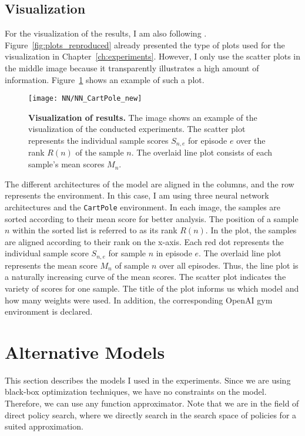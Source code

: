 \subsection{Visualization}
For the visualization of the results, I am also following \cite{oller_analyzing_2020}. Figure~\ref{fig:plots_reproduced} already presented the type of plots used for the visualization in Chapter~\ref{ch:experiments}. However, I only use the scatter plots in the middle image because it transparently illustrates a high amount of information. Figure~\ref{fig:visualization} shows an example of such a plot.
\begin{figure}[!ht]
  \centering
\texttt{[image: NN/NN\_CartPole\_new]}
\caption[Visualization of results]{
  \textbf{Visualization of results.}
  The image shows an example of the visualization of the conducted experiments. The scatter plot represents the individual sample scores $S_{n,e}$ for episode $e$ over the rank $R(n)$ of the sample $n$. The overlaid line plot consists of each sample's mean scores $M_n$.
}
\label{fig:visualization}
\end{figure}
The different architectures of the model are aligned in the columns, and the row represents the environment. In this case, I am using three neural network architectures and the \verb|CartPole| environment. In each image, the samples are sorted according to their mean score for better analysis. The position of a sample $n$ within the sorted list is referred to as its rank $R(n)$. In the plot, the samples are aligned according to their rank on the x-axis. Each red dot represents the individual sample score $S_{n,e}$ for sample $n$ in episode $e$. The overlaid line plot represents the mean score $M_n$ of sample $n$ over all episodes. Thus, the line plot is a naturally increasing curve of the mean scores. The scatter plot indicates the variety of scores for one sample. The title of the plot informs us which model and how many weights were used. In addition, the corresponding OpenAI gym environment is declared.


\section{Alternative Models}
\label{sec:models}
This section describes the models I used in the experiments. Since we are using black-box optimization techniques, we have no constraints on the model. Therefore, we can use any function approximator. Note that we are in the field of direct policy search, where we directly search in the search space of policies for a suited approximation.

